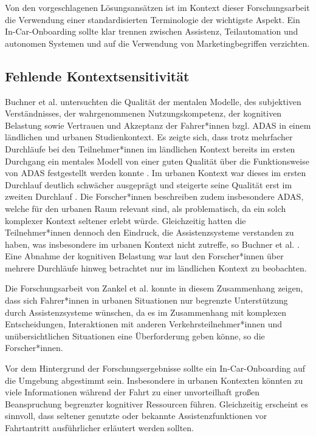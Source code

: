 Von den vorgeschlagenen Lösungsansätzen ist im Kontext dieser Forschungsarbeit die Verwendung einer standardisierten Terminologie der wichtigste Aspekt. Ein In-Car-Onboarding sollte klar trennen zwischen Assistenz, Teilautomation und autonomen Systemen und auf die Verwendung von Marketingbegriffen verzichten.

\subsection{Fehlende Kontextsensitivität}
\label{subsec:kontextsensitivität}
Buchner et al. \cite{buchner2024exploring} untersuchten die Qualität der mentalen Modelle, des subjektiven Verständnisses, der wahrgenommenen Nutzungskompetenz, der kognitiven Belastung sowie Vertrauen und Akzeptanz der Fahrer*innen bzgl. ADAS in einem ländlichen und urbanen Studienkontext. Es zeigte sich, dass trotz mehrfacher Durchläufe bei den Teilnehmer*innen im ländlichen Kontext bereits im ersten Durchgang ein mentales Modell von einer guten Qualität über die Funktionsweise von ADAS festgestellt werden konnte \cite{buchner2024exploring}. Im urbanen Kontext war dieses im ersten Durchlauf deutlich schwächer ausgeprägt und steigerte seine Qualität erst im zweiten Durchlauf \cite{buchner2024exploring}. Die Forscher*innen \cite{buchner2024exploring} beschreiben zudem insbesondere ADAS, welche für den urbanen Raum relevant sind, als problematisch, da ein solch komplexer Kontext seltener erlebt würde. Gleichzeitig hatten die Teilnehmer*innen dennoch den Eindruck, die Assistenzsysteme verstanden zu haben, was insbesondere im urbanen Kontext nicht zutreffe, so Buchner et al. \cite{buchner2024exploring}.
Eine Abnahme der kognitiven Belastung war laut den Forscher*innen \cite{buchner2024exploring} über mehrere Durchläufe hinweg betrachtet nur im ländlichen Kontext zu beobachten. 

Die Forschungsarbeit von Zankel et al. \cite{zankel2021taking} konnte in diesem Zusammenhang zeigen, dass sich Fahrer*innen in urbanen Situationen nur begrenzte Unterstützung durch Assistenzsysteme wünschen, da es im Zusammenhang mit komplexen Entscheidungen, Interaktionen mit anderen Verkehrsteilnehmer*innen und unübersichtlichen Situationen eine Überforderung geben könne, so die Forscher*innen.

Vor dem Hintergrund der Forschungsergebnisse \cite{buchner2024exploring,zankel2021taking} sollte ein In-Car-Onboarding auf die Umgebung abgestimmt sein. Insbesondere in urbanen Kontexten könnten zu viele Informationen während der Fahrt zu einer unvorteilhaft großen Beanspruchung begrenzter kognitiver Ressourcen führen.  Gleichzeitig erscheint es sinnvoll, dass seltener genutzte oder bekannte Assistenzfunktionen vor Fahrtantritt ausführlicher erläutert werden sollten.


